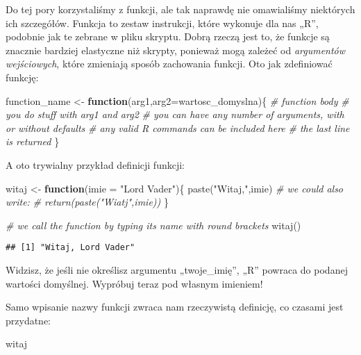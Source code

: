 \documentclass[
]{article}
\newenvironment{Shaded}{\begin{snugshade}}{\end{snugshade}}
\newcommand{\AttributeTok}[1]{\textcolor[rgb]{0.77,0.63,0.00}{#1}}
\newcommand{\CommentTok}[1]{\textcolor[rgb]{0.56,0.35,0.01}{\textit{#1}}}
\newcommand{\ControlFlowTok}[1]{\textcolor[rgb]{0.13,0.29,0.53}{\textbf{#1}}}
\newcommand{\FunctionTok}[1]{\textcolor[rgb]{0.00,0.00,0.00}{#1}}
\newcommand{\NormalTok}[1]{#1}
\newcommand{\OtherTok}[1]{\textcolor[rgb]{0.56,0.35,0.01}{#1}}
\newcommand{\StringTok}[1]{\textcolor[rgb]{0.31,0.60,0.02}{#1}}
\begin{document}
Do tej pory korzystaliśmy z funkcji, ale tak naprawdę nie omawialiśmy
niektórych ich szczegółów. Funkcja to zestaw instrukcji, które wykonuje
dla nas „R'', podobnie jak te zebrane w pliku skryptu. Dobrą rzeczą jest
to, że funkcje są znacznie bardziej elastyczne niż skrypty, ponieważ
mogą zależeć od \emph{argumentów wejściowych}, które zmieniają sposób
zachowania funkcji. Oto jak zdefiniować funkcję:

\begin{Shaded}
\begin{Highlighting}[]
\NormalTok{function\_name }\OtherTok{\textless{}{-}} \ControlFlowTok{function}\NormalTok{(arg1,}\AttributeTok{arg2=}\NormalTok{wartosc\_domyslna)\{}
  \CommentTok{\# function body}
  \CommentTok{\# you do stuff with arg1 and arg2}
  \CommentTok{\# you can have any number of arguments, with or without defaults}
  \CommentTok{\# any valid \textasciigrave{}R\textasciigrave{} commands can be included here}
  \CommentTok{\# the last line is returned}
\NormalTok{\}}
\end{Highlighting}
\end{Shaded}

A oto trywialny przykład definicji funkcji:

\begin{Shaded}
\begin{Highlighting}[]
\NormalTok{witaj }\OtherTok{\textless{}{-}} \ControlFlowTok{function}\NormalTok{(}\AttributeTok{imie =} \StringTok{"Lord Vader"}\NormalTok{)\{}
  \FunctionTok{paste}\NormalTok{(}\StringTok{"Witaj,"}\NormalTok{,imie)}
  \CommentTok{\# we could also write:}
  \CommentTok{\# return(paste("Wiatj",imie))}
\NormalTok{\}}

\CommentTok{\# we call the function by typing it\textquotesingle{}s name with round brackets}
\FunctionTok{witaj}\NormalTok{()}
\end{Highlighting}
\end{Shaded}

\begin{verbatim}
## [1] "Witaj, Lord Vader"
\end{verbatim}

Widzisz, że jeśli nie określisz argumentu „twoje\_imię'', „R'' powraca
do podanej wartości domyślnej. Wypróbuj teraz pod własnym imieniem!

Samo wpisanie nazwy funkcji zwraca nam rzeczywistą definicję, co czasami
jest przydatne:

\begin{Shaded}
\begin{Highlighting}[]
\NormalTok{witaj}
\end{Highlighting}
\end{Shaded}
\end{document}
